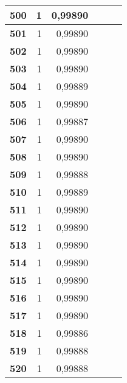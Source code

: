 \begin{longtable}{|r|r|r|l|r|r|}
\textbf{500} & 1 & 0,99890 &  & \multicolumn{1}{l|}{} & \multicolumn{1}{l|}{} \\ \hline
\textbf{501} & 1 & 0,99890 &  & \multicolumn{1}{l|}{} & \multicolumn{1}{l|}{} \\ \hline
\textbf{502} & 1 & 0,99890 &  & \multicolumn{1}{l|}{} & \multicolumn{1}{l|}{} \\ \hline
\textbf{503} & 1 & 0,99890 &  & \multicolumn{1}{l|}{} & \multicolumn{1}{l|}{} \\ \hline
\textbf{504} & 1 & 0,99889 &  & \multicolumn{1}{l|}{} & \multicolumn{1}{l|}{} \\ \hline
\textbf{505} & 1 & 0,99890 &  & \multicolumn{1}{l|}{} & \multicolumn{1}{l|}{} \\ \hline
\textbf{506} & 1 & 0,99887 &  & \multicolumn{1}{l|}{} & \multicolumn{1}{l|}{} \\ \hline
\textbf{507} & 1 & 0,99890 &  & \multicolumn{1}{l|}{} & \multicolumn{1}{l|}{} \\ \hline
\textbf{508} & 1 & 0,99890 &  & \multicolumn{1}{l|}{} & \multicolumn{1}{l|}{} \\ \hline
\textbf{509} & 1 & 0,99888 &  & \multicolumn{1}{l|}{} & \multicolumn{1}{l|}{} \\ \hline
\textbf{510} & 1 & 0,99889 &  & \multicolumn{1}{l|}{} & \multicolumn{1}{l|}{} \\ \hline
\textbf{511} & 1 & 0,99890 &  & \multicolumn{1}{l|}{} & \multicolumn{1}{l|}{} \\ \hline
\textbf{512} & 1 & 0,99890 &  & \multicolumn{1}{l|}{} & \multicolumn{1}{l|}{} \\ \hline
\textbf{513} & 1 & 0,99890 &  & \multicolumn{1}{l|}{} & \multicolumn{1}{l|}{} \\ \hline
\textbf{514} & 1 & 0,99890 &  & \multicolumn{1}{l|}{} & \multicolumn{1}{l|}{} \\ \hline
\textbf{515} & 1 & 0,99890 &  & \multicolumn{1}{l|}{} & \multicolumn{1}{l|}{} \\ \hline
\textbf{516} & 1 & 0,99890 &  & \multicolumn{1}{l|}{} & \multicolumn{1}{l|}{} \\ \hline
\textbf{517} & 1 & 0,99890 &  & \multicolumn{1}{l|}{} & \multicolumn{1}{l|}{} \\ \hline
\textbf{518} & 1 & 0,99886 &  & \multicolumn{1}{l|}{} & \multicolumn{1}{l|}{} \\ \hline
\textbf{519} & 1 & 0,99888 &  & \multicolumn{1}{l|}{} & \multicolumn{1}{l|}{} \\ \hline
\textbf{520} & 1 & 0,99888 &  & \multicolumn{1}{l|}{} & \multicolumn{1}{l|}{} \\ \hline

\end{longtable}
